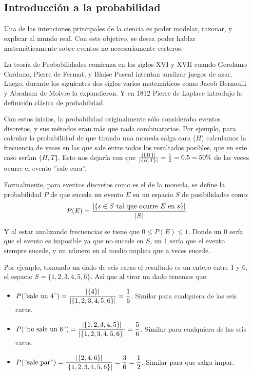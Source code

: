 \documentclass[../main.tex]{subfiles}
\begin{document}
\subsection{Introducción a la probabilidad}

\paragraph{} Una de las intenciones principales de la ciencia es poder modelar, razonar, y explicar al mundo real. Con este objetivo, se desea poder hablar matemáticamente sobre eventos no necesariamente certeros.

La teoría de Probabilidades comienza en los siglos XVI y XVII cuando Gerolamo Cardano, Pierre de Fermat, y Blaise Pascal intentan analizar juegos de azar. Luego, durante los siguientes dos siglos varios matemáticos como Jacob Bernoulli y Abraham de Moivre la expandieron. Y en 1812 Pierre de Laplace introdujo la definición clásica de probabilidad.

Con estos inicios, la probabilidad originalmente sólo consideraba eventos discretos, y sus métodos eran más que nada combinatorios. Por ejemplo, para calcular la probabilidad de que tirando una moneda salga cara (\(H\)) calculamos la frecuencia de veces en las que sale entre todos los resultados posibles, que en este caso serían \(\{H, T\}\). Esto nos dejaría con que \(\frac{|\{H\}|}{|\{H, T\}|} = \frac{1}{2} = 0.5 = 50\%\) de las veces ocurre el evento ''sale cara''.

Formalmente, para eventos discretos como es el de la moneda, se define la probabilidad \(P\) de que suceda un evento \(E\) en un espacio \(S\) de posibilidades como:
\begin{gather*}
  P(E) = \frac{|\{s \in S \text{ tal que ocurre } E \text{ en } s\}|}{|S|}
\end{gather*}

Y al estar analizando frecuencias se tiene que \(0 \leq P(E) \leq 1\). Donde un 0 sería que el evento es imposible ya que no sucede en \(S\), un 1 sería que el evento siempre sucede, y un número en el medio implica que a veces sucede.

Por ejemplo, tomando un dado de seis caras el resultado es un entero entre 1 y 6, el espacio \(S = \{1, 2, 3, 4, 5, 6\}\). Así que al tirar un dado tenemos que:
\begin{itemize}
  \item \(P(\text{''sale un 4''}) = \dfrac{|\{4\}|}{|\{1, 2, 3, 4, 5, 6\}|} = \dfrac{1}{6}\). Similar para cualquiera de las seis caras.
  \item \(P(\text{''no sale un 6''}) = \dfrac{|\{1, 2, 3, 4, 5\}|}{|\{1, 2, 3, 4, 5, 6\}|} = \dfrac{5}{6}\). Similar para cualquiera de las seis caras.
\item \(P(\text{''sale par''}) = \dfrac{|\{2, 4, 6\}|}{|\{1, 2, 3, 4, 5, 6\}|} = \dfrac{3}{6} = \dfrac{1}{2}\). Similar para que salga impar.
\end{itemize}
\end{document}
